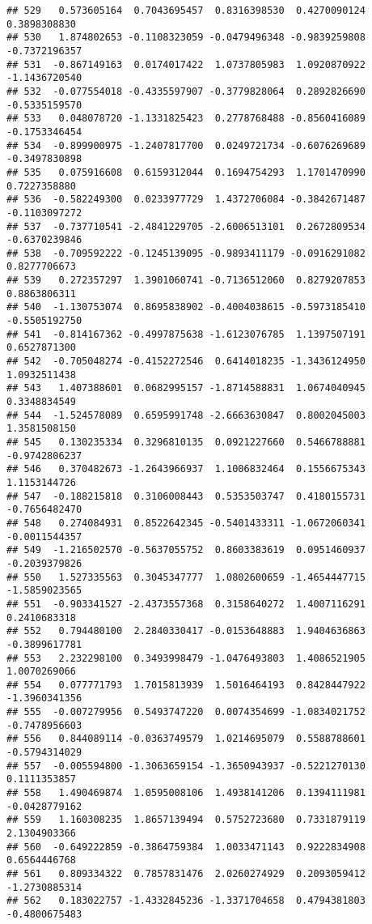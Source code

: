 \documentclass[
]{article}
\begin{document}
\begin{verbatim}
## 529   0.573605164  0.7043695457  0.8316398530  0.4270090124  0.3898308830
## 530   1.874802653 -0.1108323059 -0.0479496348 -0.9839259808 -0.7372196357
## 531  -0.867149163  0.0174017422  1.0737805983  1.0920870922 -1.1436720540
## 532  -0.077554018 -0.4335597907 -0.3779828064  0.2892826690 -0.5335159570
## 533   0.048078720 -1.1331825423  0.2778768488 -0.8560416089 -0.1753346454
## 534  -0.899900975 -1.2407817700  0.0249721734 -0.6076269689 -0.3497830898
## 535   0.075916608  0.6159312044  0.1694754293  1.1701470990  0.7227358880
## 536  -0.582249300  0.0233977729  1.4372706084 -0.3842671487 -0.1103097272
## 537  -0.737710541 -2.4841229705 -2.6006513101  0.2672809534 -0.6370239846
## 538  -0.709592222 -0.1245139095 -0.9893411179 -0.0916291082  0.8277706673
## 539   0.272357297  1.3901060741 -0.7136512060  0.8279207853  0.8863806311
## 540  -1.130753074  0.8695838902 -0.4004038615 -0.5973185410 -0.5505192750
## 541  -0.814167362 -0.4997875638 -1.6123076785  1.1397507191  0.6527871300
## 542  -0.705048274 -0.4152272546  0.6414018235 -1.3436124950  1.0932511438
## 543   1.407388601  0.0682995157 -1.8714588831  1.0674040945  0.3348834549
## 544  -1.524578089  0.6595991748 -2.6663630847  0.8002045003  1.3581508150
## 545   0.130235334  0.3296810135  0.0921227660  0.5466788881 -0.9742806237
## 546   0.370482673 -1.2643966937  1.1006832464  0.1556675343  1.1153144726
## 547  -0.188215818  0.3106008443  0.5353503747  0.4180155731 -0.7656482470
## 548   0.274084931  0.8522642345 -0.5401433311 -1.0672060341 -0.0011544357
## 549  -1.216502570 -0.5637055752  0.8603383619  0.0951460937 -0.2039379826
## 550   1.527335563  0.3045347777  1.0802600659 -1.4654447715 -1.5859023565
## 551  -0.903341527 -2.4373557368  0.3158640272  1.4007116291  0.2410683318
## 552   0.794480100  2.2840330417 -0.0153648883  1.9404636863 -0.3899617781
## 553   2.232298100  0.3493998479 -1.0476493803  1.4086521905  1.0070269066
## 554   0.077771793  1.7015813939  1.5016464193  0.8428447922 -1.3960341356
## 555  -0.007279956  0.5493747220  0.0074354699 -1.0834021752 -0.7478956603
## 556   0.844089114 -0.0363749579  1.0214695079  0.5588788601 -0.5794314029
## 557  -0.005594800 -1.3063659154 -1.3650943937 -0.5221270130  0.1111353857
## 558   1.490469874  1.0595008106  1.4938141206  0.1394111981 -0.0428779162
## 559   1.160308235  1.8657139494  0.5752723680  0.7331879119  2.1304903366
## 560  -0.649222859 -0.3864759384  1.0033471143  0.9222834908  0.6564446768
## 561   0.809334322  0.7857831476  2.0260274929  0.2093059412 -1.2730885314
## 562   0.183022757 -1.4332845236 -1.3371704658  0.4794381803 -0.4800675483

\end{verbatim}
\end{document}
